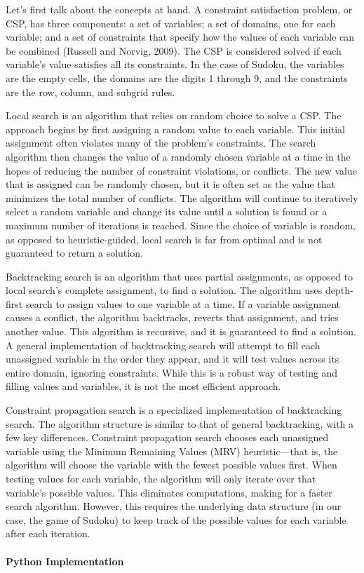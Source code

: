 \documentclass[12pt]{article}
\begin{document}
	Let's first talk about the concepts at hand. A constraint satisfaction problem, or CSP, has three components: a set of variables; a set of domains, one for each variable; and a set of constraints that specify how the values of each variable can be combined (Russell and Norvig, 2009). The CSP is considered solved if each variable's value satisfies all its constraints. In the case of Sudoku, the variables are the empty cells, the domains are the digits 1 through 9, and the constraints are the row, column, and subgrid rules.
	
	Local search is an algorithm that relies on random choice to solve a CSP. The approach begins by first assigning a random value to each variable. This initial assignment often violates many of the problem's constraints. The search algorithm then changes the value of a randomly chosen variable at a time in the hopes of reducing the number of constraint violations, or conflicts. The new value that is assigned can be randomly chosen, but it is often set as the value that minimizes the total number of conflicts. The algorithm will continue to iteratively select a random variable and change its value until a solution is found or a maximum number of iterations is reached. Since the choice of variable is random, as opposed to heuristic-guided, local search is far from optimal and is not guaranteed to return a solution.
	
	Backtracking search is an algorithm that uses partial assignments, as opposed to local search's complete assignment, to find a solution. The algorithm uses depth-first search to assign values to one variable at a time. If a variable assignment causes a conflict, the algorithm backtracks, reverts that assignment, and tries another value. This algorithm is recursive, and it is guaranteed to find a solution. A general implementation of backtracking search will attempt to fill each unassigned variable in the order they appear, and it will test values across its entire domain, ignoring constraints. While this is a robust way of testing and filling values and variables, it is not the most efficient approach.
	
	Constraint propagation search is a specialized implementation of backtracking search. The algorithm structure is similar to that of general backtracking, with a few key differences. Constraint propagation search chooses each unassigned variable using the Minimum Remaining Values (MRV) heuristic---that is, the algorithm will choose the variable with the fewest possible values first. When testing values for each variable, the algorithm will only iterate over that variable's possible values. This eliminates computations, making for a faster search algorithm. However, this requires the underlying data structure (in our case, the game of Sudoku) to keep track of the possible values for each variable after each iteration.\\\\
\textbf{Python Implementation}
	
\end{document}
